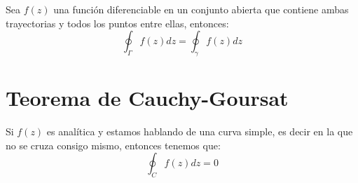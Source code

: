 \documentclass[12pt, fleqn]{report}                             %
\begin{document}
            Sea $f(z)$ una función diferenciable en un conjunto abierta que contiene ambas
            trayectorias y todos los puntos entre ellas, entonces:
            \begin{equation*}
                \oint_\Gamma f(z) dz = \oint_\gamma f(z) dz
            \end{equation*}




        \clearpage
        \section{Teorema de Cauchy-Goursat}

            Si $f(z)$ es analítica y estamos hablando de una curva simple, es decir
            en la que no se cruza consigo mismo, entonces tenemos que:
            \begin{equation*}
                \oint_C f(z) dz = 0
            \end{equation*}
\end{document}
